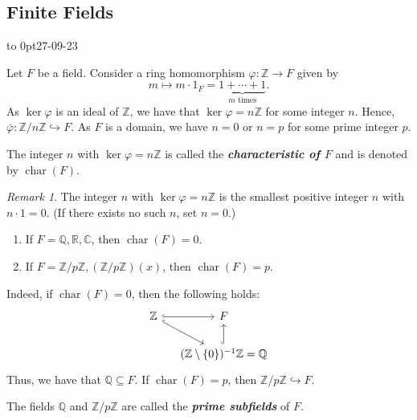 \documentclass[twoside]{article}
\DeclareMathOperator\Char{char}
\newcommand\Z{\mathbb Z}
\newcommand\Q{\mathbb Q}
\newcommand\R{\mathbb R}
\newcommand\C{\mathbb C}
\theoremstyle{remark}
\newtheorem*{remark}{{Remark}}
\newcounter{theorem}
\newcommand*\term[1]{\textbf{\textit{\mathversion{bold}#1}}}
\newcommand*\newclass[1]{\par\vbox to 0pt{\hbox{\tiny\sffamily\color{gray}#1}} \par\ignorespaces}
\begin{document}
\subsection{Finite Fields}

\newclass{27-09-23}

Let \(F\) be a field. Consider a ring homomorphism \(\varphi\colon \Z \to F\) given by
\[ m \mapsto m \cdot 1_F = \underbrace{1 + \cdots + 1}_{\text{\(m\) times}}. \]
As \(\ker\varphi\) is an ideal of \(\Z\),  we have that \(\ker\varphi = n\Z\) for some integer \(n\). Hence, \(\bar\varphi\colon \Z/n\Z \hookrightarrow F\). As \(F\) is a domain, we have \(n=0\) or \(n=p\) for some prime integer \(p\).

\begin{definition}
  The integer \(n\) with \(\ker\varphi = n\Z\) is called the \term{characteristic of \(F\)} and is denoted by \(\Char(F)\).
\end{definition}

\begin{remark}
  The integer \(n\) with \(\ker\varphi = n\Z\) is the smallest positive integer \(n\) with \(n \cdot 1 = 0\). (If there exists no such \(n\), set \(n=0\).)
\end{remark}

\begin{examples}
  \begin{enumerate}[label=\arabic*.]
    \item If \(F = \Q, \R, \C\), then \(\Char(F) = 0\).
    \item If \(F = \Z/p\Z, (\Z/p\Z)(x)\), then \(\Char(F) = p\).
  \end{enumerate}
\end{examples}

Indeed, if \(\Char(F) = 0\), then the following holds:
\begin{displaymath}
  \begin{tikzcd}[column sep=small]
    \Z \rar[hook]\arrow[dr,hook] & F\hfill \\
    & (\Z \setminus \{0\})^{-1} \Z = \Q \uar[hook]
  \end{tikzcd}
\end{displaymath}
Thus, we have that \(\Q \subseteq F\). If \(\Char(F) = p\), then \(\Z/p\Z \hookrightarrow F\).

\begin{definition}
  The fields \(\Q\) and \(\Z/p\Z\) are called the \term{prime subfields} of \(F\).
\end{definition}
\end{document}
